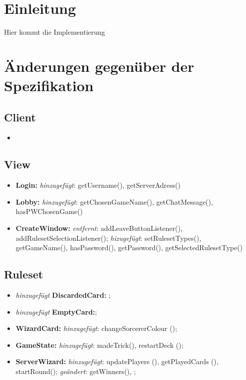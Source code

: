 \documentclass{article}
\begin{document}
\tableofcontents
\newpage

\section{Einleitung}
Hier kommt die Implementierung

\newpage

\section{Änderungen gegenüber der Spezifikation}

\subsection{Client}

\begin{itemize}
\item 
\end{itemize}

\subsection{View}

\begin{itemize}
\item \textbf{Login:} \textit{hinzugefügt}: getUsername(), getServerAdress()
\item \textbf{Lobby:} \textit{hinzugefügt}: getChosenGameName(), getChatMessage(), hasPWChosenGame()
\item \textbf{CreateWindow:} \textit{entfernt}: addLeaveButtonListener(), addRulesetSelectionListener(); \textit{hizugefügt}: setRulesetTypes(), getGameName(), hasPassword(), getPassword(), getSelectedRulesetType()
\end{itemize}

\subsection{Ruleset}

\begin{itemize}
\item \textit{hinzugefügt} \textbf{DiscardedCard:} ;

\item \textit{hinzugefügt} \textbf{EmptyCard:};

\item \textbf{WizardCard:} \textit{hinzugefügt}: changeSorcererColour ();

\item \textbf{GameState:} \textit{hinzugefügt}: madeTrick(), restartDeck ();

\item \textbf{ServerWizard:} \textit{hinzugefügt}: updatePlayers (), getPlayedCards (),
startRound(); 
\textit{geändert}: getWinners(),  ;
\end{itemize}
\end{document}
